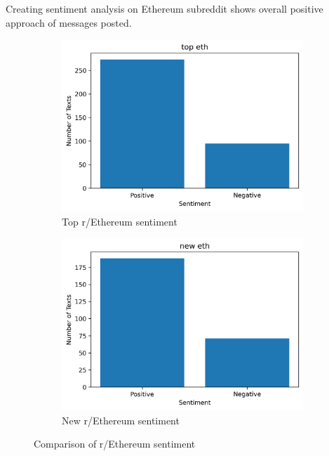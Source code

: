 Creating sentiment analysis on Ethereum subreddit shows overall positive approach of messages posted.
\begin{figure}[H]
  \begin{subfigure}{0.48\linewidth}
    \includegraphics[width=\linewidth]{img/B1/top_eth_sentiment.png}
    \caption{Top r/Ethereum sentiment}
    \label{fig:top_eth_sentiment}
  \end{subfigure}
  \begin{subfigure}{0.48\linewidth}
    \includegraphics[width=\linewidth]{img/B1/new_eth_sentiment.png}
    \caption{New r/Ethereum sentiment}
    \label{fig:new_eth_sentiment}
  \end{subfigure}
  \caption{Comparison of r/Ethereum sentiment}
  \label{fig:eth_sentiment}
\end{figure}

